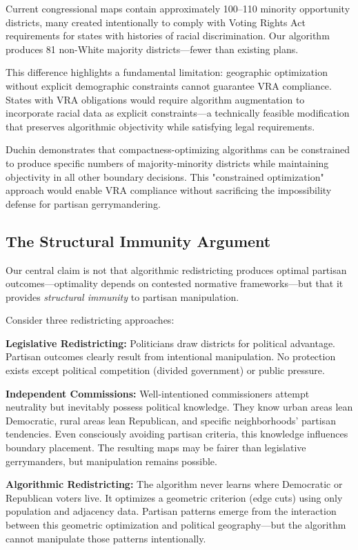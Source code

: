 Current congressional maps contain approximately 100--110 minority opportunity districts, many created intentionally to comply with Voting Rights Act requirements for states with histories of racial discrimination. Our algorithm produces 81 non-White majority districts—fewer than existing plans.

This difference highlights a fundamental limitation: geographic optimization without explicit demographic constraints cannot guarantee VRA compliance. States with VRA obligations would require algorithm augmentation to incorporate racial data as explicit constraints—a technically feasible modification that preserves algorithmic objectivity while satisfying legal requirements.

Duchin \cite{duchin2018gerrymandering} demonstrates that compactness-optimizing algorithms can be constrained to produce specific numbers of majority-minority districts while maintaining objectivity in all other boundary decisions. This "constrained optimization" approach would enable VRA compliance without sacrificing the impossibility defense for partisan gerrymandering.

\subsection{The Structural Immunity Argument}

Our central claim is not that algorithmic redistricting produces optimal partisan outcomes—optimality depends on contested normative frameworks—but that it provides \textit{structural immunity} to partisan manipulation.

Consider three redistricting approaches:

\textbf{Legislative Redistricting:} Politicians draw districts for political advantage. Partisan outcomes clearly result from intentional manipulation. No protection exists except political competition (divided government) or public pressure.

\textbf{Independent Commissions:} Well-intentioned commissioners attempt neutrality but inevitably possess political knowledge. They know urban areas lean Democratic, rural areas lean Republican, and specific neighborhoods' partisan tendencies. Even consciously avoiding partisan criteria, this knowledge influences boundary placement. The resulting maps may be fairer than legislative gerrymanders, but manipulation remains possible.

\textbf{Algorithmic Redistricting:} The algorithm never learns where Democratic or Republican voters live. It optimizes a geometric criterion (edge cuts) using only population and adjacency data. Partisan patterns emerge from the interaction between this geometric optimization and political geography—but the algorithm cannot manipulate those patterns intentionally.

